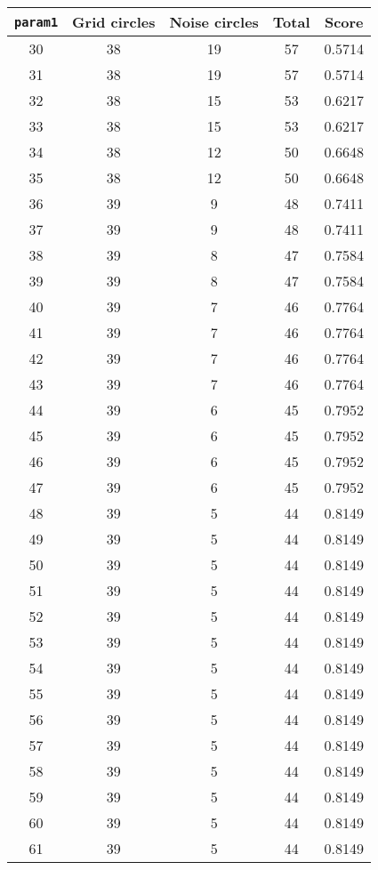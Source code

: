 \documentclass[letterpaper, 12pt]{article}
\begin{document}
\begin{longtable}{|c|c|c|c|c|}
\hline
\textbf{\texttt{param1}} & \textbf{Grid circles} & \textbf{Noise circles} & \textbf{Total} & \textbf{Score} \\
\hline
30 & 38 & 19 & 57 & 0.5714 \\
\hline
31 & 38 & 19 & 57 & 0.5714 \\
\hline
32 & 38 & 15 & 53 & 0.6217 \\
\hline
33 & 38 & 15 & 53 & 0.6217 \\
\hline
34 & 38 & 12 & 50 & 0.6648 \\
\hline
35 & 38 & 12 & 50 & 0.6648 \\
\hline
36 & 39 & 9 & 48 & 0.7411 \\
\hline
37 & 39 & 9 & 48 & 0.7411 \\
\hline
38 & 39 & 8 & 47 & 0.7584 \\
\hline
39 & 39 & 8 & 47 & 0.7584 \\
\hline
40 & 39 & 7 & 46 & 0.7764 \\
\hline
41 & 39 & 7 & 46 & 0.7764 \\
\hline
42 & 39 & 7 & 46 & 0.7764 \\
\hline
43 & 39 & 7 & 46 & 0.7764 \\
\hline
44 & 39 & 6 & 45 & 0.7952 \\
\hline
45 & 39 & 6 & 45 & 0.7952 \\
\hline
46 & 39 & 6 & 45 & 0.7952 \\
\hline
47 & 39 & 6 & 45 & 0.7952 \\
\hline
48 & 39 & 5 & 44 & 0.8149 \\
\hline
49 & 39 & 5 & 44 & 0.8149 \\
\hline
50 & 39 & 5 & 44 & 0.8149 \\
\hline
51 & 39 & 5 & 44 & 0.8149 \\
\hline
52 & 39 & 5 & 44 & 0.8149 \\
\hline
53 & 39 & 5 & 44 & 0.8149 \\
\hline
54 & 39 & 5 & 44 & 0.8149 \\
\hline
55 & 39 & 5 & 44 & 0.8149 \\
\hline
56 & 39 & 5 & 44 & 0.8149 \\
\hline
57 & 39 & 5 & 44 & 0.8149 \\
\hline
58 & 39 & 5 & 44 & 0.8149 \\
\hline
59 & 39 & 5 & 44 & 0.8149 \\
\hline
60 & 39 & 5 & 44 & 0.8149 \\
\hline
61 & 39 & 5 & 44 & 0.8149 \\

\end{longtable}
\end{document}
